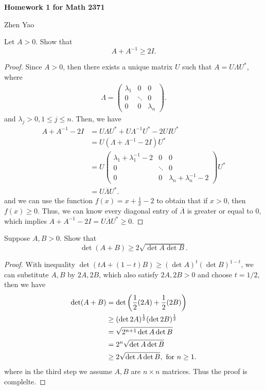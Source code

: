 \documentclass[12pt,leqno]{amsart}
\begin{document}
\centerline{\bf Homework 1 for Math 2371}
\centerline{Zhen Yao}



 Let $A > 0$. Show that 
$$A + A^{-1} \geq 2I.$$
\begin{proof}
Since $A > 0$, then there exists a unique matrix $U$ such that $A = U \Lambda U^*$, where 
\begin{align*}
    \Lambda = \begin{pmatrix}
    \lambda_1 & 0 & 0  \\
    0 & \ddots & 0  \\
    0 & 0 & \lambda_n 
    \end{pmatrix}.
\end{align*}
and $\lambda_j > 0, 1\leq j \leq n$. Then, we have
\begin{align*}
    A + A^{-1} - 2I & = U \Lambda U^* + U \Lambda^{-1} U^* - 2 U I U^* \\
    & = U\left(\Lambda + \Lambda^{-1} - 2I \right)U^* \\
    & = U \begin{pmatrix}
    \lambda_1+\lambda_1^{-1}-2 & 0 & 0  \\
    0 & \ddots & 0  \\
    0 & 0 & \lambda_n+\lambda_n^{-1}-2 
    \end{pmatrix} U^* \\
    & = U \overline{\Lambda} U^*.
\end{align*}
and we can use the function $f(x) = x + \frac{1}{x} - 2$ to obtain that if $x > 0$, then $f(x) \geq 0$. Thus, we can know every diagonal entry of $\overline{\Lambda}$ is greater or equal to $0$, which implies $A + A^{-1} - 2I = U \overline{\Lambda} U^* \geq 0$.
\end{proof}

\medskip

 Suppose $A,B > 0$. Show that $$\det (A+B) \geq 2\sqrt{\det A \det B}.$$
\begin{proof}
With inequality $\det (tA + (1-t)B) \geq (\det A)^t (\det B)^{1-t}$, we can substitute $A, B$ by $2A, 2B$, which also satisfy $2A, 2B > 0$ and choose $t = 1/2$, then we have
\begin{align*}
    \det (A+B) & = \det \left(\frac{1}{2} (2A) + \frac{1}{2} (2B)\right) \\
    & \geq (\det 2A)^{\frac{1}{2}} (\det 2B)^{\frac{1}{2}} \\
    & = \sqrt{2^{n+1} \det A \det B} \\
    & = 2^n \sqrt{\det A \det B} \\
    & \geq 2 \sqrt{\det A \det B}, \,\,{\rm for}\,\, n \geq 1.
\end{align*}
where in the third step we assume $A, B$ are $n\times n$ matrices. Thus the proof is complelte.
\end{proof}
\end{document}
